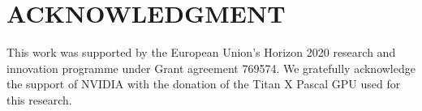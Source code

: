 \documentclass[journal]{IEEEtran}
\begin{document}
\section*{ACKNOWLEDGMENT}
This work was supported by the European Union's Horizon 2020 research
and innovation programme under Grant agreement 769574.
We gratefully acknowledge the support of NVIDIA with the donation of
the Titan X Pascal GPU used for this research.


\end{document}
